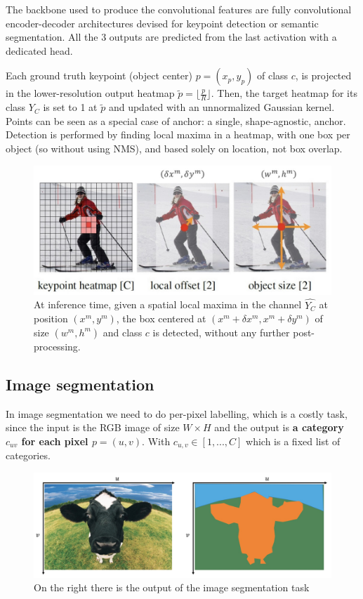 The backbone used to produce the convolutional features are fully convolutional encoder-decoder architectures devised for keypoint detection or semantic segmentation.
All the 3 outputs are predicted from the last activation with a dedicated head.

Each ground truth keypoint (object center) $p = (x_p, y_p)$ of class $c$, is projected in the lower-resolution output heatmap $\tilde{p} = \lfloor \frac{p}{R} \rfloor$.
Then, the target heatmap for its class $Y_C$ is set to 1 at $\tilde{p}$ and updated with an unnormalized Gaussian kernel.
Points can be seen as a special case of anchor: a single, shape-agnostic, anchor.
Detection is performed by finding local maxima in a heatmap, with one box per object (so without using NMS), and based solely on location, not box overlap.

\begin{figure}[htbp]
  \centering
  \includegraphics[width=0.9\linewidth]{./img/centernet.jpg}
  \caption{At inference time, given a spatial local maxima in the channel $\hat{Y_C}$ at position $(x^m, y^m)$, the box centered at $(x^m + \delta x^m, x^m + \delta y^m)$ of size $(w^m, h^m)$ and class $c$ is detected, without any further post-processing.}
\end{figure}


\subsection{Image segmentation}
In image segmentation we need to do per-pixel labelling, which is a costly task, since the input is the RGB image of size $W\times H$ and the output is \textbf{a category $c_{uv}$ for each pixel $p=(u,v)$}.
With $c_{u,v} \in [1,... ,C]$ which is a fixed list of categories.

\begin{figure}[htbp]
  \centering
  \includegraphics[width=0.7\linewidth]{./img/segmentation_task.jpg}
  \caption{On the right there is the output of the image segmentation task}
\end{figure}

